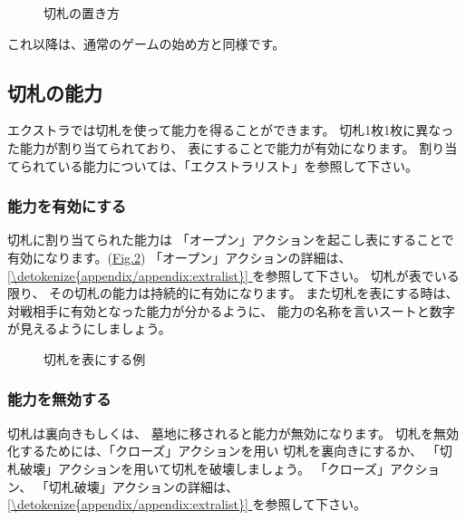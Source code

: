 \documentclass[letterpaper,10pt,dvipdfmx]{sphinxmanual}
\begin{document}
\begin{figure}[htbp]
\centering
\capstart

\noindent{}
\caption{切札の置き方}\label{\detokenize{common/common:id58}}\label{\detokenize{common/common:trump}}\end{figure}

\sphinxAtStartPar
これ以降は、通常のゲームの始め方と同様です。


\subsection{切札の能力}
\label{\detokenize{common/common:id38}}
\sphinxAtStartPar
エクストラでは切札を使って能力を得ることができます。
切札1枚1枚に異なった能力が割り当てられており、
表にすることで能力が有効になります。
割り当てられている能力については、「エクストラリスト」を参照して下さい。


\subsubsection{能力を有効にする}
\label{\detokenize{common/common:id39}}
\sphinxAtStartPar
切札に割り当てられた能力は
「オープン」アクションを起こし表にすることで有効になります。(\hyperref[\detokenize{common/common:trump-open}]{Fig.\@ \ref{\detokenize{common/common:trump-open}}})
「オープン」アクションの詳細は、 \hyperref[\detokenize{appendix/appendix:extralist}]{\ref{\detokenize{appendix/appendix:extralist}} } を参照して下さい。
切札が表でいる限り、
その切札の能力は持続的に有効になります。
また切札を表にする時は、
対戦相手に有効となった能力が分かるように、
能力の名称を言いスートと数字が見えるようにしましょう。

\begin{figure}[htbp]
\centering
\capstart

\noindent{}
\caption{切札を表にする例}\label{\detokenize{common/common:id59}}\label{\detokenize{common/common:trump-open}}\end{figure}


\subsubsection{能力を無効する}
\label{\detokenize{common/common:id40}}
\sphinxAtStartPar
切札は裏向きもしくは、
墓地に移されると能力が無効になります。
切札を無効化するためには、「クローズ」アクションを用い
切札を裏向きにするか、
「切札破壊」アクションを用いて切札を破壊しましょう。
「クローズ」アクション、
「切札破壊」アクションの詳細は、 \hyperref[\detokenize{appendix/appendix:extralist}]{\ref{\detokenize{appendix/appendix:extralist}} } を参照して下さい。
\end{document}
